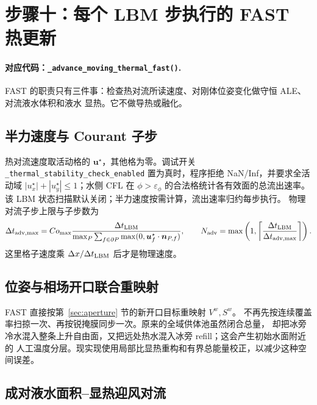 \documentclass[UTF8,zihao=-4]{ctexart}
\newcommand{\vect}[1]{\boldsymbol{#1}}
\newcommand{\code}[1]{\texttt{#1}}
\newcommand{\stepname}[1]{\paragraph{对应代码：\code{#1}.}}
\numberwithin{equation}{section}
\begin{document}
\section{步骤十：每个 LBM 步执行的 FAST 热更新}

\stepname{\_advance\_moving\_thermal\_fast()}
FAST 的职责只有三件事：检查热对流所读速度、对刚体位姿变化做守恒 ALE、对流液水体积和液水
显热。它不做导热或融化。

\subsection{半力速度与 Courant 子步}

热对流速度取活动格的 $\vect u^\star$，其他格为零。调试开关
\code{\small\_thermal\_stability\_check\_enabled} 置为真时，程序拒绝 NaN/Inf，并要求全活动域
$|u_x^\star|+|u_y^\star|\le1$；水侧 CFL 在 $\phi>\varepsilon_\phi$ 的合法格统计各有效面的总流出速率。
该 LBM 状态扫描默认关闭；半力速度按需计算，流出速率归约每步执行。
物理对流子步上限与子步数为
\begin{equation}
  \Delta t_{\rm adv,max}
  =Co_{\max}\frac{\Delta t_{\rm LBM}}
  {\max_P\sum_{f\in\partial P}\max(0,\vect u_f^\star\cdot\vect n_{P,f})},
  \qquad
  N_{\rm adv}=\max\left(1,
  \left\lceil\frac{\Delta t_{\rm LBM}}{\Delta t_{\rm adv,max}}\right\rceil\right).
  \label{eq:advection-substeps}
\end{equation}
这里格子速度乘 $\Delta x/\Delta t_{\rm LBM}$ 后才是物理速度。

\subsection{位姿与相场开口联合重映射}

FAST 直接按第~\ref{sec:aperture} 节的新开口目标重映射 $V^w,S^w$。
不再先按连续覆盖率扫掠一次、再按锐掩膜同步一次。原来的全域供体池虽然闭合总量，
却把冰旁冷水混入整条上升自由面，又把远处热水混入冰旁 refill；这会产生初始水面附近的
人工温度分层。现实现使用局部比显热重构和有界总能量校正，以减少这种空间误差。

\subsection{成对液水面积--显热迎风对流}
\end{document}
